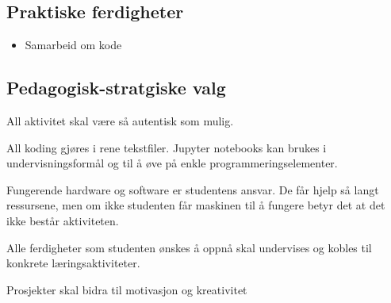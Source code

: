 \subsection{Praktiske ferdigheter}
\begin{itemize}
	\item Samarbeid om kode
\end{itemize}

\subsection{Pedagogisk-stratgiske valg}

All aktivitet skal være så autentisk som mulig.

All koding gjøres i rene tekstfiler. Jupyter notebooks kan brukes i undervisningsformål og til å øve på enkle programmeringselementer.

Fungerende hardware og software er studentens ansvar. De får hjelp så langt ressursene, men om ikke studenten får maskinen til å fungere betyr det at det ikke består aktiviteten.

Alle ferdigheter som studenten ønskes å oppnå skal undervises og kobles til konkrete læringsaktiviteter.

Prosjekter skal bidra til motivasjon og kreativitet

